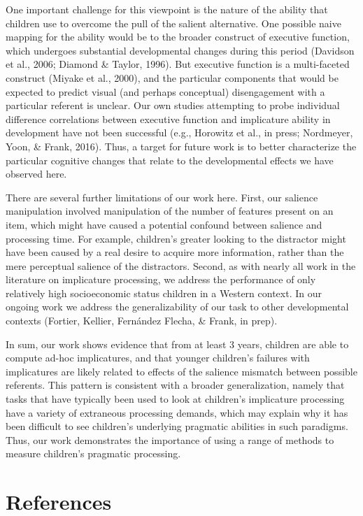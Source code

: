 \documentclass[mask,man]{apa6}
\theoremstyle{definition}
\theoremstyle{definition}
\theoremstyle{definition}
\theoremstyle{remark}
\begin{document}
One important challenge for this viewpoint is the nature of the ability
that children use to overcome the pull of the salient alternative. One
possible naive mapping for the ability would be to the broader construct
of executive function, which undergoes substantial developmental changes
during this period (Davidson et al., 2006; Diamond \& Taylor, 1996). But
executive function is a multi-faceted construct (Miyake et al., 2000),
and the particular components that would be expected to predict visual
(and perhaps conceptual) disengagement with a particular referent is
unclear. Our own studies attempting to probe individual difference
correlations between executive function and implicature ability in
development have not been successful (e.g., Horowitz et al., in press;
Nordmeyer, Yoon, \& Frank, 2016). Thus, a target for future work is to
better characterize the particular cognitive changes that relate to the
developmental effects we have observed here.

There are several further limitations of our work here. First, our
salience manipulation involved manipulation of the number of features
present on an item, which might have caused a potential confound between
salience and processing time. For example, children's greater looking to
the distractor might have been caused by a real desire to acquire more
information, rather than the mere perceptual salience of the
distractors. Second, as with nearly all work in the literature on
implicature processing, we address the performance of only relatively
high socioeconomic status children in a Western context. In our ongoing
work we address the generalizability of our task to other developmental
contexts (Fortier, Kellier, Fernández Flecha, \& Frank, in prep).

In sum, our work shows evidence that from at least 3 years, children are
able to compute ad-hoc implicatures, and that younger children's
failures with implicatures are likely related to effects of the salience
mismatch between possible referents. This pattern is consistent with a
broader generalization, namely that tasks that have typically been used
to look at children's implicature processing have a variety of
extraneous processing demands, which may explain why it has been
difficult to see children's underlying pragmatic abilities in such
paradigms. Thus, our work demonstrates the importance of using a range
of methods to measure children's pragmatic processing.

\newpage

\section{References}\label{references}
\end{document}
